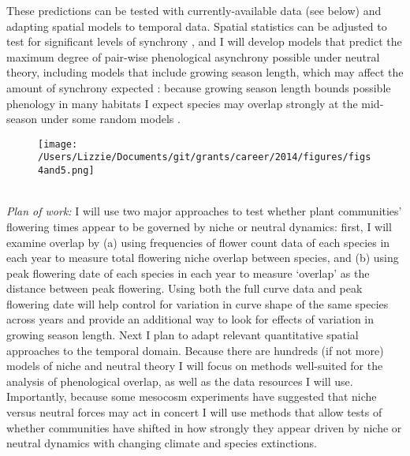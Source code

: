 \documentclass[11pt,a4paper]{article}
\begin{document}
These predictions can be tested with currently-available data (see below) and adapting spatial models to temporal data. Spatial statistics can be adjusted to test for significant levels of synchrony \citep[e.g.,][]{Bjornstad:1999kl}, and I will develop models that predict the maximum degree of pair-wise phenological asynchrony possible under neutral theory, including models that include growing season length, which may affect the amount of synchrony expected \citep{Loreau:2008xy}: because growing season length bounds possible phenology in many habitats I expect species may overlap strongly at the mid-season under some random models \citep[a phenological mid-domain effect, see][]{Morales:2005ex}. 
\begin{figure}[h!]
\begin{center}
\texttt{[image: /Users/Lizzie/Documents/git/grants/career/2014/figures/figs4and5.png]}
\end{center}
\end{figure}
\vspace{1.5ex}\\
\emph{Plan of work:} I will use two major approaches to test whether plant communities' flowering times appear to be governed by niche or neutral dynamics: first, I will examine overlap by (a) using frequencies of flower count data of each species in each year to measure total flowering niche overlap between species, and (b) using peak flowering date of each species in each year to measure `overlap' as the distance between peak flowering. Using both the full curve data and peak flowering date will help control for variation in curve shape of the same species across years \citep{CaraDonna2014} and provide an additional way to look for effects of variation in growing season length. Next I plan to adapt relevant quantitative spatial approaches \citep[e.g.,][]{Houlahan:2007qy,Vergnon:2009bh} to the temporal domain. Because there are hundreds (if not more) models of niche and neutral theory I will focus on methods well-suited for the analysis of phenological overlap, as well as the data resources I will use. Importantly, because some mesocosm experiments have suggested that niche versus neutral forces may act in concert \citep{Chase:2007yt} I will use methods that allow tests of whether communities have shifted in how strongly they appear driven by niche or neutral dynamics with changing climate and species extinctions. \\
\end{document}
